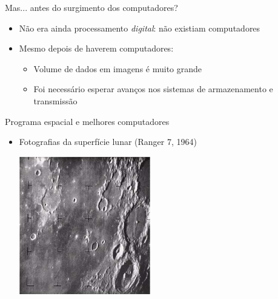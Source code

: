       \begin{slide}[toc=]{Mas... antes do surgimento dos computadores?}
	      \begin{itemize}
		      \item Não era ainda processamento \emph{digital}: não existiam computadores 
		      \item Mesmo depois de haverem computadores:
			      \begin{itemize}[type=1]
				      \item Volume de dados em imagens é muito grande
				      \item Foi necessário esperar avanços nos sistemas de armazenamento e transmissão
			      \end{itemize}
	      \end{itemize}
      \end{slide}
      
      \begin{slide}[toc=]{Programa espacial e melhores computadores}
         \begin{itemize}
            \item Fotografias da superfície lunar (Ranger 7, 1964)
            \begin{center}\includegraphics[width=0.45\textwidth]{figs/ranger7_1964}\end{center}
         \end{itemize}         
      \end{slide}
      
      
